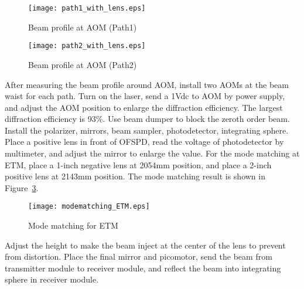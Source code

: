 \begin{figure}
	\begin{center}
		\texttt{[image: path1\_with\_lens.eps]}
		\caption{Beam profile at AOM (Path1)} 
		\label{fig:beamprofile_AOM1} 
	\end{center}
\end{figure}

\begin{figure}
	\begin{center}
		\texttt{[image: path2\_with\_lens.eps]}
		\caption{Beam profile at AOM (Path2)} 
		\label{fig:beamprofile_AOM2} 
	\end{center}
\end{figure}


After measuring the beam profile around AOM, install two AOMs at the beam waist for each path. Turn on the laser, send a 1Vdc to AOM by power supply, and adjust the AOM position to enlarge the diffraction efficiency. The largest diffraction efficiency is 93$\%$. Use beam dumper to block the zeroth order beam. Install the polarizer, mirrors, beam sampler, photodetector, integrating sphere. Place a positive lens in front of OFSPD, read the voltage of photodetector by multimeter, and adjust the mirror to enlarge the value. For the mode matching at ETM, place a 1-inch negative lens at 2054mm position, and place a 2-inch positive lens at 2143mm position. The mode matching result is shown in Figure~\ref{fig:modematching_ETM}.



\begin{figure}
	\begin{center}
		\texttt{[image: modematching\_ETM.eps]}
		\caption{Mode matching for ETM}
		\label{fig:modematching_ETM} 
	\end{center}
\end{figure}

Adjust the height to make the beam inject at the center of the lens to prevent from distortion. Place the final mirror and picomotor, send the beam from transmitter module to receiver module, and reflect the beam into integrating sphere in receiver module.

